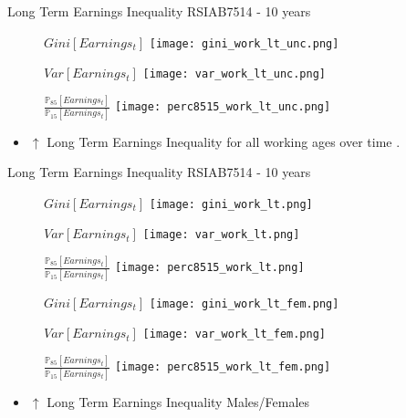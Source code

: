 \documentclass{beamer}
\let\oldcite=\cite
\renewcommand{\cite}[1]{\textcolor[rgb]{.0,.2,.7}{\oldcite{#1}}}
\begin{document}
\begin{frame}{Long Term Earnings Inequality RSIAB7514 - 10 years }
\begin{figure}[!t]
\centering
\begin{minipage}[b]{0.32\textwidth}{$Gini[Earnings_t]$}
\centering
\texttt{[image: gini\_work\_lt\_unc.png]}
\end{minipage}
\begin{minipage}[b]{0.32\textwidth}{$Var[Earnings_t]$}
\centering
\texttt{[image: var\_work\_lt\_unc.png]}
\end{minipage}
\begin{minipage}[b]{0.32\textwidth}{$\frac{\mathbb{P}_{85}[Earnings_t]}{\mathbb{P}_{15}[Earnings_t]}$}
\centering
\texttt{[image: perc8515\_work\_lt\_unc.png]}
\end{minipage}
\end{figure}
\begin{itemize}
\setlength{\itemsep}{0.7 cm}
\item $\uparrow$ Long Term Earnings Inequality for all working ages over time \cite{BoCo15}.
\end{itemize}
\end{frame}

\begin{frame}{Long Term Earnings Inequality RSIAB7514 - 10 years}
\begin{figure}[!t]
\centering
\begin{minipage}[b]{0.32\textwidth}{$Gini[Earnings_t]$}
\centering
\texttt{[image: gini\_work\_lt.png]}
\end{minipage}
\begin{minipage}[b]{0.32\textwidth}{$Var[Earnings_t]$}
\centering
\texttt{[image: var\_work\_lt.png]}
\end{minipage}
\begin{minipage}[b]{0.32\textwidth}{$\frac{\mathbb{P}_{85}[Earnings_t]}{\mathbb{P}_{15}[Earnings_t]}$}
\centering
\texttt{[image: perc8515\_work\_lt.png]}
\end{minipage}
\begin{minipage}[b]{0.32\textwidth}{$Gini[Earnings_t]$}
\centering
\texttt{[image: gini\_work\_lt\_fem.png]}
\end{minipage}
\begin{minipage}[b]{0.32\textwidth}{$Var[Earnings_t]$}
\centering
\texttt{[image: var\_work\_lt\_fem.png]}
\end{minipage}
\begin{minipage}[b]{0.32\textwidth}{$\frac{\mathbb{P}_{85}[Earnings_t]}{\mathbb{P}_{15}[Earnings_t]}$}
\centering
\texttt{[image: perc8515\_work\_lt\_fem.png]}
\end{minipage}
\end{figure}
\begin{itemize}
\setlength{\itemsep}{0.7 cm}
\item $\uparrow$ Long Term Earnings Inequality Males/Females
\end{itemize}
\end{frame}
\end{document}

